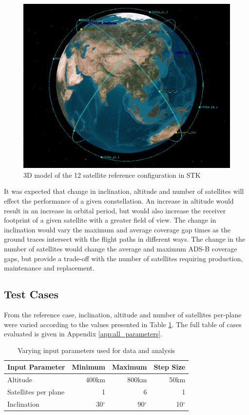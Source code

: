 \begin{figure}[htbp]
	\centering
	\includegraphics[scale = 0.4]{Pictures/12sat_3d.png}
	
	\caption{3D model of the 12 satellite reference configuration in STK}
	\label{fig:12sat_3d}
\end{figure} 

It was expected that change in inclination, altitude and number of satellites will effect the performance of a given constellation. An increase in altitude would result in an increase in orbital period, but would also increase the receiver footprint of a given satellite with a greater field of view. The change in inclination would vary the maximum and average coverage gap times as the ground traces intersect with the flight paths in different ways.  The change in the number of satellites would change the average and maximum ADS-B coverage gaps, but provide a trade-off with the number of satellites requiring production, maintenance and replacement.

\subsection{Test Cases}
\label{sec:sat_testcases}
From the reference case, inclination, altitude and number of satellites per-plane were varied according to the values presented in Table \ref{tab:satInputParams}. The full table of cases evaluated is given in Appendix \ref{app:all_parameters}.
\begin{table}[H]
  \centering
  \caption{Varying input parameters used for data and analysis}
    \begin{tabular}{lrrr}
    \toprule
    Input Parameter & Minimum & Maximum & Step Size \\
    \midrule
    Altitude & 400km & 800km & 50km  \\
    Satellites per plane & 1 & 6 & 1\\
    Inclination & 30$^\circ$ & 90$^\circ$ & 10$^\circ$ \\
    \bottomrule
    \end{tabular}%
  \label{tab:satInputParams}%
\end{table}%
